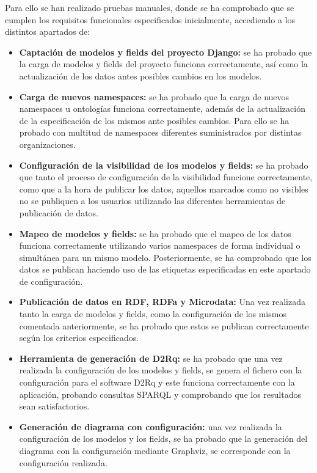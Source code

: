 Para ello se han realizado pruebas manuales, donde se ha comprobado que se
cumplen los requisitos funcionales especificados inicialmente, accediendo a los
distintos apartados de:
\begin{itemize}
    \item \textbf{Captación de modelos y fields del proyecto Django:} se ha
        probado que la carga de modelos y fields del proyecto funciona
        correctamente, así como la actualización de los datos antes posibles
        cambios en los modelos.
    \item \textbf{Carga de nuevos namespaces:} se ha probado que la carga de
        nuevos namespaces u ontologías funciona correctamente, además de la
        actualización de la especificación de los mismos ante posibles cambios.
        Para ello se ha probado con multitud de namespaces diferentes
        suministrados por distintas organizaciones.
    \item \textbf{Configuración de la visibilidad de los modelos y fields:} se
        ha probado que tanto el proceso de configuración de la visibilidad
        funcione correctamente, como que a la hora de publicar los datos,
        aquellos marcados como no visibles no se publiquen a los usuarios
        utilizando las diferentes herramientas de publicación de datos.
    \item \textbf{Mapeo de modelos y fields:} se ha probado que el mapeo de los
        datos funciona correctamente utilizando varios namespaces de forma
        individual o simultánea para un mismo modelo. Posteriormente, se ha
        comprobado que los datos se publican haciendo uso de las etiquetas
        especificadas en este apartado de configuración.
    \item \textbf{Publicación de datos en RDF, RDFa y Microdata:} Una vez
        realizada tanto la carga de modelos y fields, como la configuración de
        los mismos comentada anteriormente, se ha probado que estos se publican
        correctamente según los criterios especificados.
    \item \textbf{Herramienta de generación de D2Rq:} se ha probado que una vez
        realizada la configuración de los modelos y fields, se genera el fichero
        con la configuración para el software D2Rq y este funciona correctamente
        con la aplicación, probando consultas SPARQL y comprobando que los
        resultados sean satisfactorios.
    \item \textbf{Generación de diagrama con configuración:} una vez realizada
        la configuración de los modelos y los fields, se ha probado que la
        generación del diagrama con la configuración mediante Graphviz, se
        corresponde con la configuración realizada.
\end{itemize}

